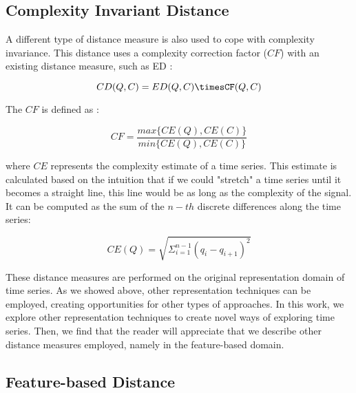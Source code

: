 \subsection{Complexity Invariant Distance}
\label{subsec:complexity}

A different type of distance measure is also used to cope with complexity invariance. This distance uses a complexity correction factor ($CF$) with an existing distance measure, such as ED \cite{complexity}:

\begin{equation}
CD(Q,C) = ED(Q,C)\timesCF(Q,C)
\end{equation}

The $CF$ is defined as \cite{complexity}:

\begin{equation}
CF = \frac{max\{CE(Q),CE(C)\}}{min\{CE(Q),CE(C)\}}
\end{equation}

where $CE$ represents the complexity estimate of a time series. This estimate is calculated based on the intuition that if we could  "stretch" a time series until it becomes a straight line, this line would be as long as the complexity of the signal. It can be computed as the sum of the $n-th$ discrete differences along the time series\cite{complexity}:

\begin{equation}
\label{eq:complexity}
CE(Q) = \sqrt{\Sigma^{n-1}_{i=1} (q_i - q_{i+1})^2}
\end{equation}

These distance measures are performed on the original representation domain of time series. As we showed above, other representation techniques can be employed, creating opportunities for other types of approaches. In this work, we explore other representation techniques to create novel ways of exploring time series. Then, we find that the reader will appreciate that we describe other distance measures employed, namely in the feature-based domain. 

\subsection{Feature-based Distance}
\label{subsec:features_dist}


